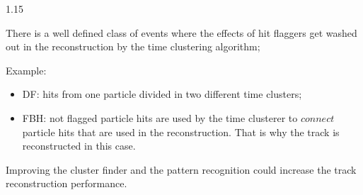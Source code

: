 \documentclass{beamer}
\begin{document}
\begin{frame}
\begin{columns}
\begin{column}{1.15\framewidth}
    \begin{itemize}
       {\small \item There is a well defined class of events where the effects of hit flaggers get washed out in the reconstruction by the time clustering algorithm;
        \item Example:
        \begin{itemize}
            \item DF: hits from one particle divided in two different time clusters;
            \item FBH: not flagged particle hits are used by the time clusterer to $connect$ particle hits that are used in the reconstruction. That is why the track is reconstructed in this case.
        \end{itemize}
        
        \item Improving the cluster finder and the pattern recognition could increase the track reconstruction performance.
        }
    \end{itemize}
\end{column}
\end{columns}
\end{frame}
\end{document}

